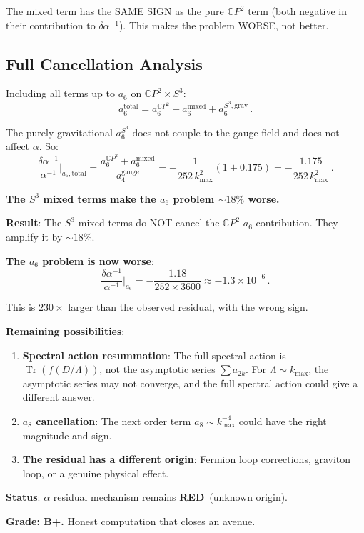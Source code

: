 \documentclass[11pt,a4paper]{article}
\newcommand{\RED}{\textcolor{dfdred}{\textbf{RED}}}
\newcommand{\Tr}{\operatorname{Tr}}
\newcommand{\CP}{\mathbb{C}P}
\begin{document}
The mixed term has the SAME SIGN as the pure $\CP^2$ term (both negative in their contribution to $\delta\alpha^{-1}$). This makes the problem WORSE, not better.

\subsection{Full Cancellation Analysis}

Including all terms up to $a_6$ on $\CP^2 \times S^3$:
\begin{equation}
a_6^{\mathrm{total}} = a_6^{\CP^2} + a_6^{\mathrm{mixed}} + a_6^{S^3,\mathrm{grav}}\,.
\end{equation}

The purely gravitational $a_6^{S^3}$ does not couple to the gauge field and does not affect $\alpha$. So:
\begin{equation}
\frac{\delta\alpha^{-1}}{\alpha^{-1}}\bigg|_{a_6,\mathrm{total}} = \frac{a_6^{\CP^2} + a_6^{\mathrm{mixed}}}{a_4^{\mathrm{gauge}}} = -\frac{1}{252\,k_{\max}^2}(1 + 0.175) = -\frac{1.175}{252\,k_{\max}^2}\,.
\end{equation}

\textbf{The $S^3$ mixed terms make the $a_6$ problem $\sim 18\%$ worse.}

\begin{tcolorbox}[colback=red!5!white, colframe=red!60!black, title={Agent 7: $a_6$ Cancellation --- DOES NOT WORK}]
\textbf{Result}: The $S^3$ mixed terms do NOT cancel the $\CP^2$ $a_6$ contribution. They amplify it by $\sim 18\%$.

\textbf{The $a_6$ problem is now worse}:
\begin{equation}
\frac{\delta\alpha^{-1}}{\alpha^{-1}}\bigg|_{a_6} = -\frac{1.18}{252 \times 3600} \approx -1.3 \times 10^{-6}\,.
\end{equation}

This is $230\times$ larger than the observed residual, with the wrong sign.

\textbf{Remaining possibilities}:
\begin{enumerate}
\item \textbf{Spectral action resummation}: The full spectral action is $\Tr(f(D/\Lambda))$, not the asymptotic series $\sum a_{2k}$. For $\Lambda \sim k_{\max}$, the asymptotic series may not converge, and the full spectral action could give a different answer.
\item \textbf{$a_8$ cancellation}: The next order term $a_8 \sim k_{\max}^{-4}$ could have the right magnitude and sign.
\item \textbf{The residual has a different origin}: Fermion loop corrections, graviton loop, or a genuine physical effect.
\end{enumerate}

\textbf{Status}: $\alpha$ residual mechanism remains \RED\ (unknown origin).

\textbf{Grade: B+.} Honest computation that closes an avenue.
\end{tcolorbox}
\end{document}
